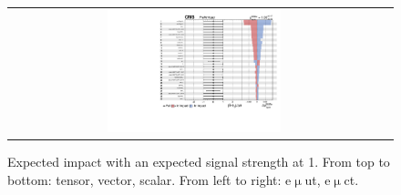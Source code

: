 \begin{figure}[tbh!]
\begin{center}
\begin{tabular}{cc}
  \includegraphics[width=0.48\textwidth]{figures/Appendix/Impact/Impact_ScalarC_expected}\\
 \end{tabular}
 \caption{Expected impact with an expected signal strength at 1. From top to bottom: tensor, vector, scalar. From left to right: e$\upmu$ut, e$\upmu$ct.}
 \label{fig:Impact2}
 \end{center}
\end{figure}
